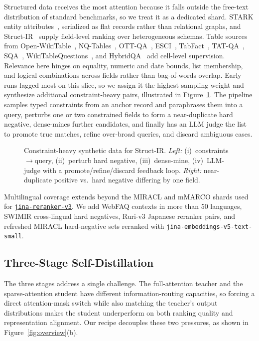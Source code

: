 \documentclass{article}
\newcommand{\jrrvthree}{\href{https://huggingface.co/jinaai/jina-reranker-v3}{\texttt{jina-reranker-v3}}}
\newcommand{\jinaembedsmall}{\texttt{jina-embeddings-v5-text-small}}
\newcommand{\structir}{Struct-IR}
\begin{document}
Structured data receives the most attention because it falls outside the free-text distribution of standard benchmarks, so we treat it as a dedicated shard. STARK entity attributes~\citep{stark}, serialized as flat records rather than relational graphs, and Struct-IR~\citep{ssrb} supply field-level ranking over heterogeneous schemas. Table sources from Open-WikiTable~\citep{openwikitable}, NQ-Tables~\citep{nqtables}, OTT-QA~\citep{ottqa}, ESCI~\citep{esci}, TabFact~\citep{tabfact}, TAT-QA~\citep{tatqa}, SQA~\citep{sqa}, WikiTableQuestions~\citep{wtq}, and HybridQA~\citep{hybridqa} add cell-level supervision. Relevance here hinges on equality, numeric and date bounds, list membership, and logical combinations across fields rather than bag-of-words overlap. Early runs lagged most on this slice, so we assign it the highest sampling weight and synthesize additional constraint-heavy pairs, illustrated in Figure~\ref{fig:structir-pipeline}. The pipeline samples typed constraints from an anchor record and paraphrases them into a query, perturbs one or two constrained fields to form a near-duplicate hard negative, dense-mines further candidates, and finally has an LLM judge the list to promote true matches, refine over-broad queries, and discard ambiguous cases.

\begin{figure}[t]
  \centering
  \resizebox{\textwidth}{!}{}%
  \caption{Constraint-heavy synthetic data for \structir{}.
  \emph{Left:} (i)~constraints$\rightarrow$query, (ii)~perturb hard negative, (iii)~dense-mine, (iv)~LLM-judge with a promote/refine/discard feedback loop.
  \emph{Right:} near-duplicate positive vs.\ hard negative differing by one field.}
  \label{fig:structir-pipeline}
\end{figure}

Multilingual coverage extends beyond the MIRACL and mMARCO shards used for \jrrvthree{}. We add WebFAQ contexts in more than 50 languages, SWIMIR cross-lingual hard negatives, Ruri-v3 Japanese reranker pairs, and refreshed MIRACL hard-negative sets reranked with \jinaembedsmall{}.

\subsection{Three-Stage Self-Distillation}
\label{sec:training}

The three stages address a single challenge. The full-attention teacher and the sparse-attention student have different information-routing capacities, so forcing a direct attention-mask switch while also matching the teacher's output distributions makes the student underperform on both ranking quality and representation alignment. Our recipe decouples these two pressures, as shown in Figure~\ref{fig:overview}(b).
\end{document}

